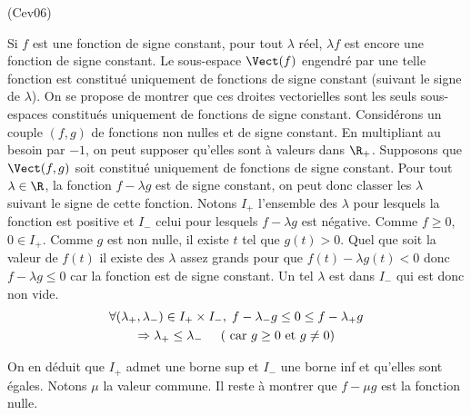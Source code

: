 \begin{tiny}(Cev06)\end{tiny} Si $f$ est une fonction de signe constant, pour tout $\lambda$ réel, $\lambda f$ est encore une fonction de signe constant. Le sous-espace $\Vect(f)$ engendré par une telle fonction est constitué uniquement de fonctions de signe constant (suivant le signe de $\lambda$).\newline
On se propose de montrer que ces droites vectorielles sont les seuls sous-espaces constitués uniquement de fonctions de signe constant.\newline
Considérons un couple $(f,g)$ de fonctions non nulles et de signe constant. En multipliant au besoin par $-1$, on peut supposer qu'elles sont à valeurs dans $\R_+$. Supposons que $\Vect(f,g)$ soit constitué uniquement de fonctions de signe constant.\newline
Pour tout $\lambda \in \R$, la fonction $f - \lambda g$ est de signe constant, on peut donc classer les $\lambda$ suivant le signe de cette fonction. Notons $I_+$ l'ensemble des $\lambda$ pour lesquels la fonction est positive et $I_-$ celui pour lesquels $f-\lambda g$ est négative.\newline
Comme $f \geq 0$, $0 \in I_+$. Comme $g$ est non nulle, il existe $t$ tel que $g(t)>0$. Quel que soit la valeur de $f(t)$ il existe des $\lambda$ assez grands pour que $f(t) - \lambda g(t) < 0$ donc $f - \lambda g \leq 0$ car la fonction est de signe constant. Un tel $\lambda$ est dans $I_-$ qui est donc non vide.
\begin{multline*}
 \forall(\lambda_+, \lambda_-)\in I_+\times I_-,\;
 f - \lambda_-g \leq 0 \leq f - \lambda_+ g \\
 \Rightarrow \lambda_+ \leq \lambda_- \hspace{0.5cm} (\text{ car } g\geq 0 \text{ et } g \neq 0)
\end{multline*}

On en déduit que $I_+$ admet une borne sup et $I_-$ une borne inf et qu'elles sont égales. Notons $\mu$ la valeur commune. Il reste à montrer que $f - \mu g$ est la fonction nulle.
